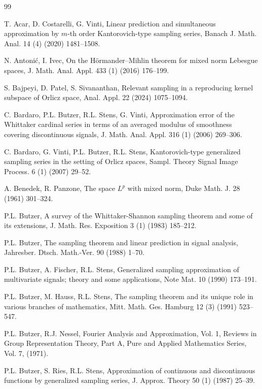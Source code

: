 \documentclass[11pt, a4paper]{article}
\theoremstyle{definition}
\numberwithin{equation}{section}
\begin{document}
	\begin{thebibliography}{99}
		\setlength{\itemsep}{-2pt}
			
		 T. Acar, D. Costarelli, G. Vinti, Linear prediction and simultaneous approximation by 
$m$-th order Kantorovich-type sampling series, Banach J. Math. Anal. 14 (4) (2020) 1481–1508.

 N. Antonić, I. Ivec, On the Hörmander–Mihlin theorem for mixed norm Lebesgue spaces, J. Math. Anal. Appl. 433 (1) (2016) 176–199.

S. Bajpeyi, D. Patel, S. Sivananthan, Relevant sampling in a reproducing kernel subspace of Orlicz space, Anal. Appl. 22 (2024) 1075–1094.

 C. Bardaro, P.L. Butzer, R.L. Stens, G. Vinti, Approximation error of the Whittaker cardinal series in terms of an averaged modulus of smoothness covering discontinuous signals, J. Math. Anal. Appl. 316 (1) (2006) 269–306.

 C. Bardaro, G. Vinti, P.L. Butzer, R.L. Stens, Kantorovich-type generalized sampling series in the setting of Orlicz spaces, Sampl. Theory Signal Image Process. 6 (1) (2007) 29–52.

 A. Benedek, R. Panzone, The space $L^p$ with mixed norm, Duke Math. J. 28 (1961) 301–324.



 P.L. Butzer, A survey of the Whittaker-Shannon sampling theorem and some of its extensions, J. Math. Res. Exposition 3 (1) (1983) 185–212.

 P.L. Butzer, The sampling theorem and linear prediction in signal analysis, Jahresber. Dtsch. Math.-Ver. 90 (1988) 1–70.


 P.L. Butzer, A. Fischer, R.L. Stens, Generalized sampling approximation of multivariate signals; theory and some applications, Note Mat. 10 (1990) 173–191.

 P.L. Butzer, M. Hauss, R.L. Stens, The sampling theorem and its unique role in various branches of mathematics, Mitt. Math. Ges. Hamburg 12 (3) (1991) 523–547.

 P.L. Butzer, R.J. Nessel, Fourier Analysis and Approximation, Vol. 1, Reviews in Group Representation Theory, Part A, Pure and Applied Mathematics Series, Vol. 7, (1971).

 P.L. Butzer, S. Ries, R.L. Stens, Approximation of continuous and discontinuous functions by generalized sampling series, J. Approx. Theory 50 (1) (1987) 25–39.


\end{thebibliography}
\end{document}
